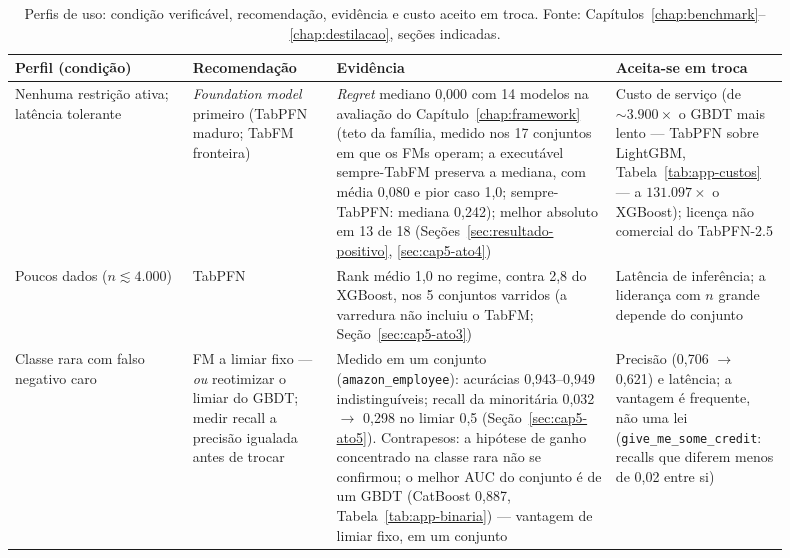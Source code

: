 \begin{table}[p]
\centering
\caption[Perfis de uso: condição, recomendação, evidência e troca]{Perfis de uso: condição verificável, recomendação, evidência e
custo aceito em troca. Fonte: Capítulos~\ref{chap:benchmark}--\ref{chap:destilacao}, seções indicadas.}
\label{tab:conc-perfis}
\scriptsize
\setlength{\tabcolsep}{5pt}
\renewcommand{\arraystretch}{1.0}
\begin{tabular}{>{\raggedright\arraybackslash}p{0.21\linewidth}>{\raggedright\arraybackslash}p{0.17\linewidth}>{\raggedright\arraybackslash}p{0.33\linewidth}>{\raggedright\arraybackslash}p{0.19\linewidth}}
\toprule
\textbf{Perfil (condição)} & \textbf{Recomendação} & \textbf{Evidência} &
\textbf{Aceita-se em troca} \\
\midrule
Nenhuma restrição ativa; latência tolerante &
\emph{Foundation model} primeiro (TabPFN maduro; TabFM fronteira) &
\emph{Regret} mediano 0,000 com 14 modelos na avaliação do
Capítulo~\ref{chap:framework} (teto da família, medido nos 17
conjuntos em que os FMs operam; a
executável sempre-TabFM preserva a mediana, com média 0,080 e pior
caso 1,0; sempre-TabPFN: mediana 0,242); melhor absoluto em 13 de 18
(Seções~\ref{sec:resultado-positivo}, \ref{sec:cap5-ato4}) &
Custo de serviço (de ${\sim}3.900\times$ o GBDT mais lento ---
TabPFN sobre LightGBM, Tabela~\ref{tab:app-custos} --- a
$131.097\times$ o XGBoost); licença não comercial
do TabPFN-2.5 \\
\addlinespace[2.5pt]
Poucos dados ($n \lesssim 4.000$) &
TabPFN &
Rank médio 1,0 no regime, contra 2,8 do XGBoost, nos 5 conjuntos
varridos (a varredura não incluiu o TabFM;
Seção~\ref{sec:cap5-ato3}) &
Latência de inferência; a liderança com $n$ grande depende do conjunto \\
\addlinespace[2.5pt]
Classe rara com falso negativo caro &
FM a limiar fixo --- \emph{ou} reotimizar o limiar do GBDT; medir
recall a precisão igualada antes de trocar &
Medido em um conjunto (\texttt{amazon\_employee}): acurácias
0,943--0,949 indistinguíveis;
recall da minoritária 0,032 $\to$ 0,298 no limiar 0,5
(Seção~\ref{sec:cap5-ato5}). Contrapesos: a hipótese de ganho
concentrado na classe rara não se confirmou; o
melhor AUC do conjunto é de um GBDT (CatBoost 0,887,
Tabela~\ref{tab:app-binaria}) --- vantagem de
limiar fixo, em um conjunto &
Precisão (0,706 $\to$ 0,621) e latência; a vantagem é frequente, não
uma lei (\texttt{give\_\allowbreak me\_\allowbreak some\_\allowbreak credit}: recalls que diferem
menos de
0,02 entre si) \\

\end{tabular}
\end{table}
